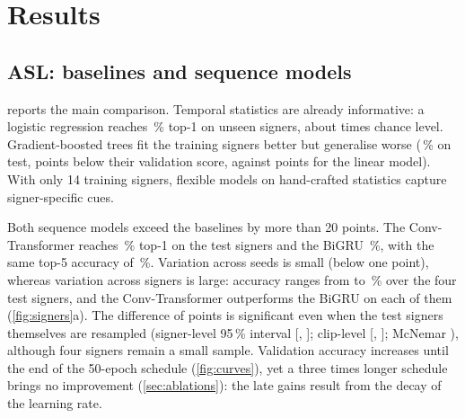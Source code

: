 \section{Results}
\label{sec:results}

\subsection{ASL: baselines and sequence models}
\label{sec:results-asl}

\begin{table}[t]
  \centering
  \caption{ASL results (\numAslClasses{} signs). Validation and test sets contain 3 and 4 signers
  absent from training. Sequence models: mean $\pm$ standard deviation over three seeds, 50
  epochs. The last column is the standard deviation of top-1 accuracy across the four test
  signers. All values in \%.}
  \label{tab:main}
  \small
  
\end{table}

 reports the main comparison. Temporal statistics are already informative: a
logistic regression reaches \numAslLogregTest{}\,\% top-1 on unseen signers, about
\numAslLogregChance{} times chance level. Gradient-boosted trees fit the training signers better
but generalise worse (\numAslLgbmTest{}\,\% on test, \numAslLgbmDrop{} points below their
validation score, against \numAslLogregDrop{} points for the linear model). With only 14
training signers, flexible models on hand-crafted statistics capture signer-specific cues.

Both sequence models exceed the baselines by more than 20 points. The Conv-Transformer reaches
\numTrTestTop{}\,\% top-1 on the test signers and the BiGRU \numGruTestTop{}\,\%, with the same
top-5 accuracy of \numTrTestTopFive{}\,\%. Variation across seeds is small (below one point), whereas variation
across signers is large: accuracy ranges from \numSignerMin{} to \numSignerMax{}\,\% over the four
test signers, and the Conv-Transformer outperforms the BiGRU on each of them
(\cref{fig:signers}a). The difference of \numTrGruDiff{} points is significant even when the test
signers themselves are resampled (signer-level 95\,\% interval
[\numTrGruCiLo{}, \numTrGruCiHi{}]; clip-level [\numTrGruClipCiLo{}, \numTrGruClipCiHi{}];
McNemar \numTrGruMcnemar{}), although four signers remain a small sample. Validation accuracy increases until the end of the 50-epoch schedule
(\cref{fig:curves}), yet a three times longer schedule brings no improvement
(\cref{sec:ablations}): the late gains result from the decay of the learning rate.

